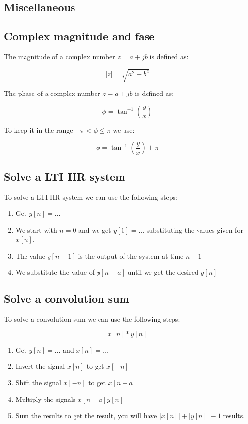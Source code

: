 \documentclass[letterpaper]{article}
\newcommand{\divline}{\noindent\makebox[\linewidth]{\rule{\textwidth}{0.4pt}}}
\begin{document}
    \divline

    \begin{multicols}{2}
        \section{Miscellaneous}

        \subsection{Complex magnitude and fase}

        The magnitude of a complex number $z = a + jb$ is defined as:

        \[|z| = \sqrt{a^2 + b^2}\]

        The phase of a complex number $z = a + jb$ is defined as:

        \[\phi = \tan^{-1}{\left( \frac{y}{x} \right)}\]

        To keep it in the range $-\pi < \phi \leq \pi$ we use:

        \[\phi = \tan^{-1}{\left( \frac{y}{x} \right)} + \pi\]

        \subsection{Solve a LTI IIR system}

        To solve a LTI IIR system we can use the following steps:

        \begin{enumerate}
            \item Get $y[n] = ...$
            \item We start with $n = 0$ and we get $y[0] = ...$ substituting the values given for $x[n]$.
            \item The value $y[n-1]$ is the output of the system at time $n-1$
            \item We substitute the value of $y[n-a]$ until we get the desired $y[n]$
        \end{enumerate}

        \subsection{Solve a convolution sum}

        To solve a convolution sum we can use the following steps:

        \[x[n] * y[n]\]

        \begin{enumerate}
            \item Get $y[n] = ...$ and $x[n] = ...$
            \item Invert the signal $x[n]$ to get $x[-n]$
            \item Shift the signal $x[-n]$ to get $x[n-a]$
            \item Multiply the signals $x[n-a]y[n]$
            \item Sum the results to get the result, you will have $|x[n]| + |y[n]| - 1$ results.
        \end{enumerate}
    \end{multicols}
\end{document}
